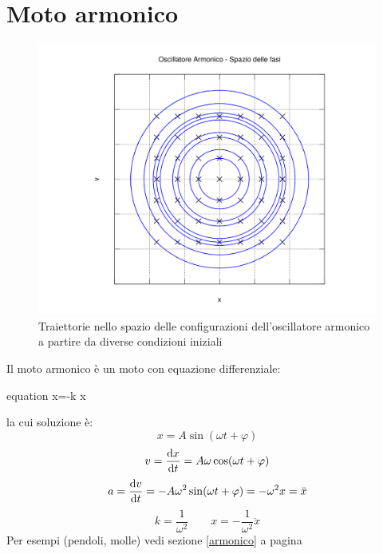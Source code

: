 \section{Moto armonico}
\begin{figure}[htbp]
 \centering
 \includegraphics[scale=0.6]{immagini/fisica1/oscillatore_fase}
 \caption{Traiettorie nello spazio delle configurazioni dell'oscillatore armonico a partire da diverse condizioni iniziali}
\end{figure}
Il moto armonico è un moto con equazione differenziale:
\begin{eqimp}{equation}
\ddot x=-k x
\end{eqimp}
la cui soluzione è:
\begin{equation*}x=A\sin(\omega t+\varphi)\end{equation*}
\begin{equation*}v=\frac{\mathrm{d} x}{\mathrm{d} t}=A\omega\cos(\omega t+\varphi)\end{equation*}
\begin{equation*}a=\frac{\mathrm{d} v}{\mathrm{d} t}=-A\omega^2\sin(\omega t+\varphi)=-\omega^2 x=\ddot x\end{equation*}
\begin{equation*}k=\frac{1}{\omega^2}\qquad x=-\frac{1}{\omega^2}\ddot x\end{equation*}
 Per esempi (pendoli, molle) vedi sezione \ref{armonico} a
pagina \pageref{armonico}
